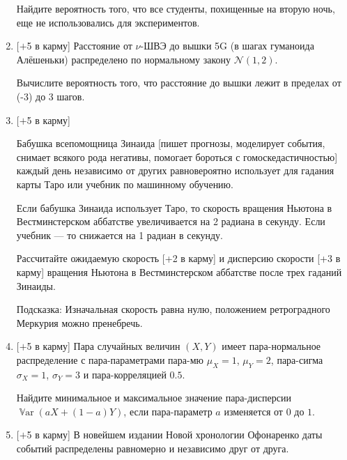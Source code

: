 \documentclass[12pt]{article}
\newcommand{\cN}{\mathcal{N}}
\DeclareMathOperator{\Var}{\mathbb{V}ar}
\begin{document}
\begin{enumerate}
    Найдите вероятность того, что все студенты, похищенные на вторую ночь, еще не использовались для экспериментов.
    
    
    \item  %
    $[+$5 в карму] Расстояние от $\nu$-ШВЭ до вышки 5G (в шагах гуманоида Алёшеньки) распределено по нормальному закону $\cN(1, 2)$.

    Вычислите вероятность того, что расстояние до вышки лежит в пределах от (-3) до 3 шагов.
    
    
    \item  %
    $[+$5 в карму] 

    Бабушка всепомощница Зинаида [пишет прогнозы, моделирует события, снимает всякого рода негативы, помогает бороться с гомоскедастичностью]
    каждый день независимо от других равно\-веро\-ятно использует для гадания карты Таро или учебник по машинному обучению. 

    Если бабушка Зинаида использует Таро, то скорость вращения Ньютона в Вестминстерском аббат\-стве увеличивается на 2 радиана в секунду. Если учебник — то снижается на 1 радиан в секунду. 

    Рассчитайте ожидаемую скорость [+2 в карму] и дисперсию скорости [+3 в карму] вращения Ньютона в Вестминстерском аббатстве после трех гаданий Зинаиды. 

    Подсказка: Изначальная скорость равна нулю, положением ретроградного Меркурия можно пренеб\-речь. 
    
    
    \item  %
    $[+$5 в карму] Пара случайных величин $(X, Y)$
    имеет пара-нормальное распределение с пара-парамет\-рами пара-мю $\mu_X = 1$, 
    $\mu_Y = 2$, пара-сигма $\sigma_X = 1$, $\sigma_Y = 3$ и пара-корреляцией $0.5$.

    Найдите минимальное и максимальное значение пара-дисперсии $\Var(a X +(1-a)Y)$, если пара-параметр $a$ изменяется от $0$ до $1$.
    
    
    \item  $[+$5 в карму] 
    В новейшем издании Новой хронологии Офонаренко даты событий распределены 
    равномерно и независимо друг от друга. 


\end{enumerate}
\end{document}
